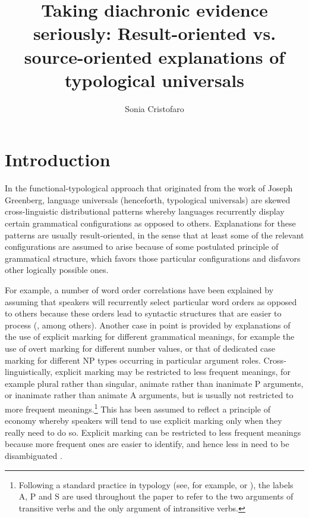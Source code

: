 \documentclass[output=paper]{langsci/langscibook}
\author{Sonia Cristofaro\affiliation{University of Pavia}}
\title{Taking diachronic evidence seriously: Result-oriented
  vs. source-oriented explanations of typological universals}
\begin{document}
\maketitle 
  
\label{p:cristofaro:evidenceseriously}
 

\section{Introduction}\label{intro}
In the functional-typological approach that originated from the work
of Joseph Greenberg, language universals (henceforth, typological
universals) are skewed cross-linguistic distributional patterns whereby languages recurrently display certain grammatical configurations as opposed to others. Explanations for these patterns are usually result-oriented, in the sense  that at least some of the relevant configurations are assumed to arise because of some postulated principle of grammatical structure, which favors those particular configurations and disfavors other logically possible ones.

For example, a number of word order correlations have been explained by assuming that speakers will recurrently select particular word orders as opposed to others because these orders lead to syntactic structures that are easier to process (\citealt{Hawkins2004},  among others). Another case in point is provided by explanations of the use of explicit marking for different grammatical meanings, for example the use of overt marking for different number values, or that of dedicated case marking for different NP types occurring in particular argument roles. Cross-linguistically, explicit marking may be restricted to less frequent meanings, for example plural rather than singular, animate rather than
inanimate P arguments, or inanimate rather than animate A arguments, but
is usually not restricted to more frequent meanings.\footnote{Following a standard
    practice in typology (see, for example, \citealt{Comrie2} or \citealt{Dixon1994}), the labels A, P and S are used throughout
    the paper to refer to the two arguments of transitive verbs and
    the only argument of intransitive verbs.} This has been assumed to reflect a principle of economy whereby speakers will tend to use explicit marking only when they really need to do so. Explicit marking can be restricted to less frequent meanings because more frequent ones are easier to identify, and hence less in need to be disambiguated
\citep{Greenberg1966,Corbett2000,TU2,Martinmarkedness,Haspelmath2008}. 
\end{document}
